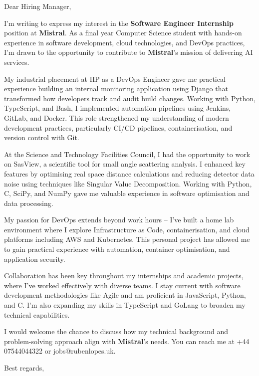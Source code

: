 \documentclass[11pt, a4paper]{letter}
\date{\today}
\makeatletter
\newcommand{\recipientCompany}{Mistral}
\newcommand{\jobPosition}{Software Engineer Internship}
\newcommand{\industry}{AI}
\newcommand{\phoneNumber}{+44 07544044322}
\newcommand{\email}{jobs@rubenlopes.uk}
\makeatother
\begin{document}
\begin{letter}{Dear Hiring Manager,}

\opening{}
\onehalfspacing

I'm writing to express my interest in the \textbf{\jobPosition} position at \textbf{\recipientCompany}. As a final year Computer Science student with hands-on experience in software development, cloud technologies, and DevOps practices, I'm drawn to the opportunity to contribute to \textbf{\recipientCompany}'s mission of delivering \industry{} services.

My industrial placement at HP as a DevOps Engineer gave me practical experience building an internal monitoring application using Django that transformed how developers track and audit build changes. Working with Python, TypeScript, and Bash, I implemented automation pipelines using Jenkins, GitLab, and Docker. This role strengthened my understanding of modern development practices, particularly CI/CD pipelines, containerisation, and version control with Git.

At the Science and Technology Facilities Council, I had the opportunity to work on SasView, a scientific tool for small angle scattering analysis. I enhanced key features by optimising real space distance calculations and reducing detector data noise using techniques like Singular Value Decomposition. Working with Python, C, SciPy, and NumPy gave me valuable experience in software optimisation and data processing.

My passion for DevOps extends beyond work hours – I've built a home lab environment where I explore Infrastructure as Code, containerisation, and cloud platforms including AWS and Kubernetes. This personal project has allowed me to gain practical experience with automation, container optimisation, and application security.

Collaboration has been key throughout my internships and academic projects, where I've worked effectively with diverse teams. I stay current with software development methodologies like Agile and am proficient in JavaScript, Python, and C. I'm also expanding my skills in TypeScript and GoLang to broaden my technical capabilities.

I would welcome the chance to discuss how my technical background and problem-solving approach align with \textbf{\recipientCompany}'s needs. You can reach me at \phoneNumber{} or \email.

\closing{Best regards,}

\end{letter}
\end{document}
